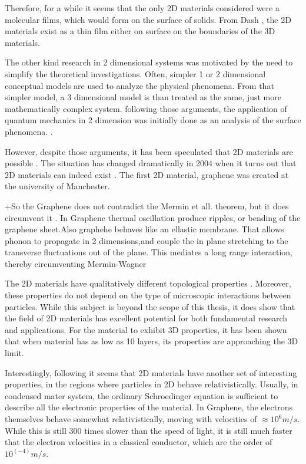 Therefore, for a while it seems that the only 2D materials considered were a molecular films, which would form on the surface of solids. From Dash \cite{2DMatter1}, the 2D materials exist as a thin film either on surface on the boundaries of the 3D materials.

The other kind research in 2 dimensional systems was motivated by the need to simplify the theoretical investigations. Often, simpler 1 or 2 dimensional  conceptual models are used to analyze the physical phenomena. From that simpler model, a 3 dimensional model is than treated as the same, just more mathematically complex system.  following those arguments, the application of  quantum mechanics in 2 dimension was initially done as an analysis of the surface phenomena. \cite{2dfilm}. 

However, despite those arguments, it has been speculated that 2D materials are possible \cite{2DMatter1}. The situation has changed dramatically in 2004 when it turns out that 2D materials can indeed exist \cite{Graphene0}. The first 2D material, graphene was created \cite{GrapheneN} at the university of Manchester.

+So the Graphene does not contradict the Mermin et all. theorem, but it does circumvent it \cite{GrapheneRiples}. In Graphene thermal oscillation produce ripples, or bending of the graphene sheet.Also graphehe behaves like an ellastic membrane. That allows phonon to propagate in 2 dimensions,and couple the in plane stretching to the transverse fluctuations out of the plane. This mediates a long range interaction, thereby circumventing Mermin-Wagner 

The 2D materials have qualitatively different topological properties \cite{2DMatterCurvature}. Moreover, these properties do not depend on the type of microscopic interactions between particles. While this subject is beyond the scope of this thesis, it does show that the field of 2D materials has excellent potential for both fundamental research and applications. For the material to exhibit 3D properties, it has been shown \cite{GraphLayers} that when material has as low as 10 layers, its properties are approaching the 3D limit.

Interestingly, following \cite{Graphene0} it seems that 2D materials have another set of interesting properties, in the regions where particles in 2D behave relativistically. Usually, in condensed mater system, the ordinary Schroedinger equation is sufficient to describe all the electronic properties of the material. In Graphene, the electrons themselves behave somewhat relativistically, moving with velocities of $ \approx 10^6 m/s $. While this is still 300 times slower than the speed of light, it is still much faster that the electron velocities in a classical conductor, which are the order of $ 10^(-4) m/s $.

